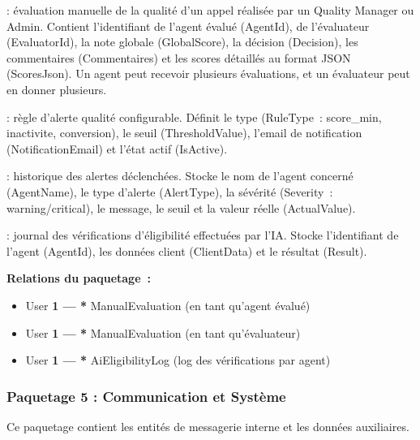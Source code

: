 \begin{description}[itemsep=4pt]
    \item[\textbf{ManualEvaluation}] : évaluation manuelle de la qualité d'un appel
    réalisée par un Quality Manager ou Admin. Contient l'identifiant de l'agent
    évalué (AgentId), de l'évaluateur (EvaluatorId), la note globale (GlobalScore),
    la décision (Decision), les commentaires (Commentaires) et les scores détaillés
    au format JSON (ScoresJson). Un agent peut recevoir plusieurs évaluations,
    et un évaluateur peut en donner plusieurs.

    \item[\textbf{AlertRule}] : règle d'alerte qualité configurable. Définit le type
    (RuleType~: score\_min, inactivite, conversion), le seuil (ThresholdValue),
    l'email de notification (NotificationEmail) et l'état actif (IsActive).

    \item[\textbf{AlertHistory}] : historique des alertes déclenchées. Stocke le nom
    de l'agent concerné (AgentName), le type d'alerte (AlertType), la sévérité
    (Severity~: warning/critical), le message, le seuil et la valeur réelle
    (ActualValue).

    \item[\textbf{AiEligibilityLog}] : journal des vérifications d'éligibilité
    effectuées par l'IA. Stocke l'identifiant de l'agent (AgentId), les données
    client (ClientData) et le résultat (Result).
\end{description}

\textbf{Relations du paquetage~:}
\begin{itemize}
    \item User \textbf{1 --- *} ManualEvaluation (en tant qu'agent évalué)
    \item User \textbf{1 --- *} ManualEvaluation (en tant qu'évaluateur)
    \item User \textbf{1 --- *} AiEligibilityLog (log des vérifications par agent)
\end{itemize}

\subsubsection{Paquetage 5 : Communication et Système}

Ce paquetage contient les entités de messagerie interne et les données auxiliaires.

